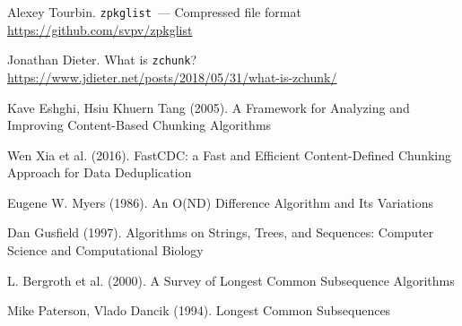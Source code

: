 \documentclass[russian,a4paper,12pt]{article}
\begin{document}
\begin{thebibliography}{9}

Alexey Tourbin. \verb|zpkglist|~--- Compressed file format\\
\url{https://github.com/svpv/zpkglist}

Jonathan Dieter. What is \verb|zchunk|?\\
\url{https://www.jdieter.net/posts/2018/05/31/what-is-zchunk/}

Kave Eshghi, Hsiu Khuern Tang (2005).
A Framework for Analyzing and Improving Content-Based Chunking Algorithms

Wen Xia et al. (2016).
FastCDC: a Fast and Efficient Content-Defined Chunking Approach for Data Deduplication

Eugene W. Myers (1986).  An O(ND) Difference Algorithm and Its Variations

Dan Gusfield (1997).  Algorithms on Strings, Trees, and Sequences:
Computer Science and Computational Biology

L. Bergroth et al. (2000).  A Survey of Longest Common Subsequence Algorithms

Mike Paterson, Vlado Dancik (1994).  Longest Common Subsequences

\end{thebibliography}
\end{document}
